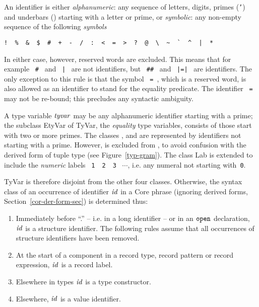 An identifier is either {\sl alphanumeric}: any sequence of
letters, digits, primes ({\tt '}) and underbars (\wildpat) starting
with a letter or prime, or {\sl symbolic}: any non-empty sequence of the
following {\sl symbols}
\vspace*{-6pt}
\begin{center}
\verb(!  %  &  $  #  +  -  /  :  <  =  >  ?  @  \  ~  `  ^  |  *(
\end{center}
\vspace*{-6pt}
In either case, however, reserved words are excluded.   This means that for
example ~\verb+#+~ and ~{\tt |}~ are not identifiers, but  ~\verb+##+~ and
~{\tt |=|}~ are identifiers.
The only exception to this rule is that the symbol ~{\tt =}~, which is
a reserved word, is also allowed as an identifier to stand for
the equality predicate.
The identifier ~{\tt =}~ may not be re-bound;
this precludes any syntactic ambiguity.

A type variable ${\it tyvar}$\label{etyvar-lab} may be any
alphanumeric identifier starting with a prime; the subclass EtyVar of
TyVar, the {\sl equality} type variables, consists of those 
start with two or more primes.  
The classes {\VId}, 
{\TyCon} and  {\Lab} are represented by identifiers
not starting with a prime.
However, {\tt *} is excluded from {\TyCon},
to avoid confusion with the derived form of tuple type (see
Figure~\ref{typ-gram}). The class Lab is extended to
include the {\em numeric} labels ~{\tt 1}~~{\tt 2}~~{\tt 3}~ $\cdots$,
i.e. any numeral not starting with~{\tt 0}. 

TyVar is therefore disjoint from the other four classes.   
Otherwise, the syntax class of an occurrence of
identifier ${\it id}$ in a Core phrase (ignoring derived forms, 
Section~\ref{cor-der-form-sec}) is determined thus:
\begin{enumerate}
  \item Immediately before ``.'' -- i.e. in a long identifier -- or in an
        ${\tt open}$ declaration, ${\it id}$ is a structure
        identifier.  The following rules assume that all occurrences of
        structure identifiers have been removed.
  \item At the start of a component in a record type, record pattern or record
        expression,  ${\it id}$ is a record label.
  \item Elsewhere in types ${\it id}$ is a type constructor.
  \item Elsewhere, ${\it id}$ is a value identifier.
\end{enumerate}%


